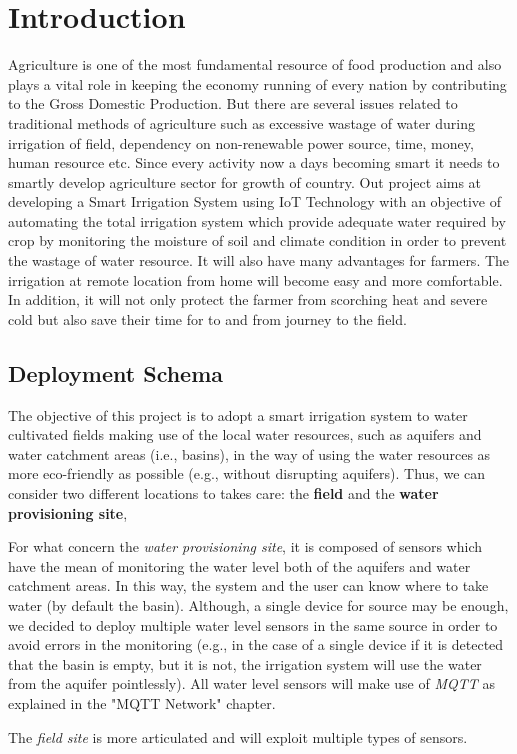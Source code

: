 \section{Introduction}
Agriculture is one of the most fundamental resource of food production and also plays a vital role in keeping the economy running of every nation by contributing to the Gross Domestic Production. But there are several issues related to traditional methods of agriculture such as excessive wastage of water during irrigation of field, dependency on non-renewable power source, time, money, human resource etc. Since every activity now a days becoming smart it needs to smartly develop agriculture sector for growth of country. Out project aims at developing a Smart Irrigation System using IoT Technology with an objective of automating the total irrigation system which provide adequate water required by crop by monitoring the moisture of soil and climate condition in order to prevent the wastage of water resource. It will also have many advantages for farmers. The irrigation at remote location from home will become easy and more comfortable. In addition, it will not only protect the farmer from scorching heat and severe cold but also save their time for to and from journey to the field.



\subsection{Deployment Schema}
The objective of this project is to adopt a smart irrigation system to water cultivated fields making use of the local water resources, such as aquifers and water catchment areas (i.e., basins), in the way of using the water resources as more eco-friendly as possible (e.g., without disrupting aquifers). Thus, we can consider two different locations to takes care: the \textbf{field} and the \textbf{water provisioning site},

For what concern the \textit{water provisioning site}, it is composed of sensors which have the mean of monitoring the water level both of the aquifers and water catchment areas. In this way, the system and the user can know where to take water (by default the basin). Although, a single device for source may be enough, we decided to deploy multiple water level sensors in the same source in order to avoid errors in the monitoring (e.g., in the case of a single device if it is detected that the basin is empty, but it is not, the irrigation system will use the water from the aquifer pointlessly).
All water level sensors will make use of \textit{MQTT} as explained in the "MQTT Network" chapter.


The \textit{field site} is more articulated and will exploit multiple types of sensors.